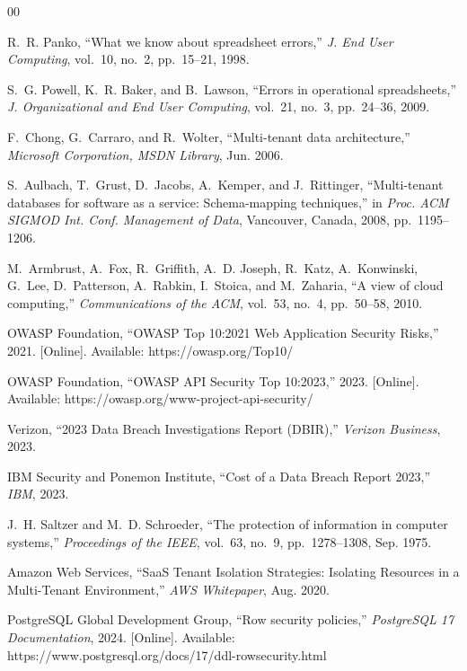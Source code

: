 \documentclass[conference]{IEEEtran}
\begin{document}
\newpage

\begin{thebibliography}{00}
\setlength{\itemsep}{1.5pt}
\setlength{\parskip}{0pt}

R.~R. Panko, ``What we know about spreadsheet errors,'' \emph{J. End User Computing}, vol.~10, no.~2, pp.~15--21, 1998.

S.~G. Powell, K.~R. Baker, and B.~Lawson, ``Errors in operational spreadsheets,'' \emph{J. Organizational and End User Computing}, vol.~21, no.~3, pp.~24--36, 2009.

F.~Chong, G.~Carraro, and R.~Wolter, ``Multi-tenant data architecture,'' \emph{Microsoft Corporation, MSDN Library}, Jun. 2006.

S.~Aulbach, T.~Grust, D.~Jacobs, A.~Kemper, and J.~Rittinger, ``Multi-tenant databases for software as a service: Schema-mapping techniques,'' in \emph{Proc. ACM SIGMOD Int. Conf. Management of Data}, Vancouver, Canada, 2008, pp.~1195--1206.

M.~Armbrust, A.~Fox, R.~Griffith, A.~D. Joseph, R.~Katz, A.~Konwinski, G.~Lee, D.~Patterson, A.~Rabkin, I.~Stoica, and M.~Zaharia, ``A view of cloud computing,'' \emph{Communications of the ACM}, vol.~53, no.~4, pp.~50--58, 2010.

OWASP Foundation, ``OWASP Top 10:2021 Web Application Security Risks,'' 2021. [Online]. Available: https://owasp.org/Top10/

OWASP Foundation, ``OWASP API Security Top 10:2023,'' 2023. [Online]. Available: https://owasp.org/www-project-api-security/

Verizon, ``2023 Data Breach Investigations Report (DBIR),'' \emph{Verizon Business}, 2023.

IBM Security and Ponemon Institute, ``Cost of a Data Breach Report 2023,'' \emph{IBM}, 2023.

J.~H. Saltzer and M.~D. Schroeder, ``The protection of information in computer systems,'' \emph{Proceedings of the IEEE}, vol.~63, no.~9, pp.~1278--1308, Sep. 1975.

Amazon Web Services, ``SaaS Tenant Isolation Strategies: Isolating Resources in a Multi-Tenant Environment,'' \emph{AWS Whitepaper}, Aug. 2020.

PostgreSQL Global Development Group, ``Row security policies,'' \emph{PostgreSQL 17 Documentation}, 2024. [Online]. Available: https://www.postgresql.org/docs/17/ddl-rowsecurity.html


\end{thebibliography}
\end{document}
